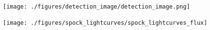 \documentclass{nature_arxiv}
\begin{document}
\maketitle

\vspace{10pt}

\vspace{10pt}

\makeaffil

\begin{multicols}{2}


\begin{figure}[tbp]
\begin{center}
\texttt{[image: ./figures/detection\_image/detection\_image.png]}
\caption{ \protect}
\end{center}
\end{figure}


\begin{figure}[tbp]
\begin{center}
\texttt{[image: ./figures/spock\_lightcurves/spock\_lightcurves\_flux]}
\caption{ \protect}
\end{center}
\end{figure}


\end{multicols}
\end{document}

